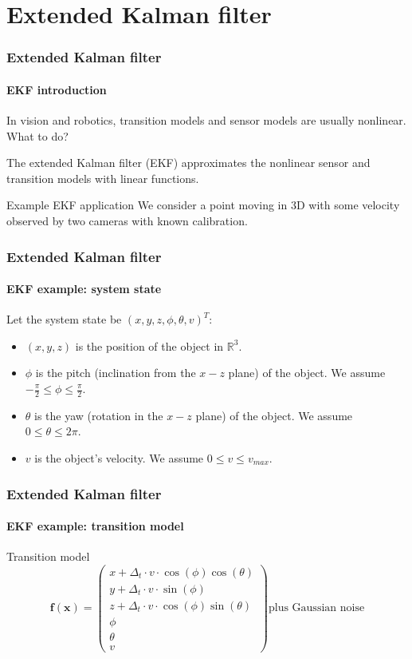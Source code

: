 \documentclass[aspectratio=169]{beamer}
\renewcommand{\vec}[1]{\boldsymbol{#1}}
\def\Rset{\mathbb{R}}
\begin{document}
\section{Extended Kalman filter}

\begin{frame}
\frametitle{Extended Kalman filter}
\framesubtitle{EKF introduction}

In vision and robotics, transition models and sensor models are
usually nonlinear.  What to do?

\medskip
The \alert{extended Kalman filter} (EKF) approximates the nonlinear
sensor and transition models with linear functions.

\medskip
\begin{block}{Example EKF application}
We consider a point moving in 3D with some velocity observed by two
cameras with known calibration.
\end{block}

\end{frame}


\begin{frame}
\frametitle{Extended Kalman filter}
\framesubtitle{EKF example: system state}

Let the system state be $(x,y,z,\phi,\theta,v)^T$:
\begin{itemize}
\item $(x,y,z)$ is the position of the object in $\Rset^3$.
\item $\phi$ is the pitch (inclination from the $x-z$ plane) of the
      object.  We assume $-\frac{\pi}{2} \leq \phi \leq \frac{\pi}{2}$.
\item $\theta$ is the yaw (rotation in the $x-z$ plane) of the
      object.  We assume $0 \leq \theta \leq 2\pi$.
\item $v$ is the object's velocity.  We assume $0 \leq v \leq v_{max}$.
\end{itemize}

\end{frame}


\begin{frame}
\frametitle{Extended Kalman filter}
\framesubtitle{EKF example: transition model}

\begin{block}{Transition model}
\begin{equation*} \vec{f}(\vec{x}) = \begin{pmatrix}
    x + \Delta_t \cdot v \cdot \cos(\phi) \cos(\theta) \\
    y + \Delta_t \cdot v \cdot \sin(\phi) \\
    z + \Delta_t \cdot v \cdot \cos(\phi) \sin(\theta) \\
    \phi \\
    \theta \\
    v
    \end{pmatrix} \text{plus Gaussian noise}
\end{equation*}
\end{block}

\end{frame}
\end{document}
